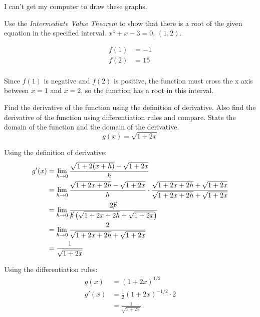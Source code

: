 \documentclass[fleqn,addpoints]{exam}
\begin{document}
\begin{questions}
\begin{solution}
I can't get my computer to draw these graphs.
\end{solution}

\question Use the {\em Intermediate Value Theorem} to show that there is a root of the given equation in the specified
interval.  $x^4 + x - 3 = 0$, $(1, 2)$.

\begin{solution}
\begin{align*}
  f(1) &= -1 \\
  f(2) &= 15 \\
\end{align*}

Since $f(1)$ is negative and $f(2)$ is positive, the function must cross the x axis between $x = 1$ and $x = 2$, so the
function has a root in this interval.

\end{solution}

\question Find the derivative of the function using the definition of derivative. Also find the derivative of
the function using differentiation rules and compare. State the domain of the function and the domain of the derivative.
\[
  g(x) = \sqrt{1 + 2x}
\]

\begin{solution}

Using the definition of derivative:
\begin{align*}
  g'(x) &= \lim_{h \to 0} \frac{\sqrt{1 + 2(x + h)} - \sqrt{1 + 2x}}{h} \\
  &= \lim_{h \to 0} \frac{\sqrt{1 + 2x + 2h} - \sqrt{1 + 2x}}{h} 
      \cdot \frac{\sqrt{1 + 2x + 2h} + \sqrt{1 + 2x}}{\sqrt{1 + 2x + 2h} + \sqrt{1 + 2x}} \\
  &= \lim_{h \to 0} \frac{2 \cancel{h}}{\cancel{h} \left( \sqrt{1 + 2x + 2h} + \sqrt{1 + 2x} \right)} \\
  &= \lim_{h \to 0} \frac{2}{\sqrt{1 + 2x + 2h} + \sqrt{1 + 2x}} \\
  &= \frac{1}{\sqrt{1 + 2x}} \\
\end{align*}

Using the differentiation rules:
\begin{align*}
  g(x) &= (1 + 2x)^{1/2} \\  
  g'(x) &= \frac{1}{2} (1 + 2x)^{-1/2} \cdot 2 \\
        &= \frac{1}{\sqrt{1 + 2x}} \\
\end{align*}


\end{solution}
\end{questions}
\end{document}

